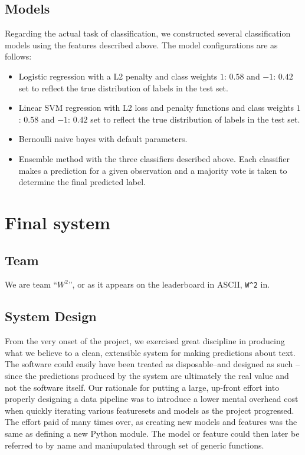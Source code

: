 \documentclass[
10pt, %
a4paper, %
oneside, %
headinclude,footinclude, %
BCOR5mm, %
]{scrartcl}
\begin{document}

\subsection{Models}
Regarding the actual task of classification, we constructed several 
classification models using the features described above. The model 
configurations are as follows:

\begin{itemize}
	\item Logistic regression with a L2 penalty and class weights $1$: $0.58$ and
	$-1$: $0.42$ set to reflect the true distribution of labels in the test set.

	\item Linear SVM regression with L2 loss and penalty functions and class 
	weights $1$: $0.58$ and $-1$: $0.42$ set to reflect the true distribution of
	labels in the test set.

	\item Bernoulli naive bayes with default parameters.

	\item Ensemble method with the three classifiers described above. Each 
	classifier makes a prediction for a given observation and a majority vote is
	taken to determine the final predicted label.
\end{itemize}

\break
\section{Final system}

\subsection{Team}

We are team ``$W^2$'', or as it appears on the leaderboard in ASCII,
\texttt{W\string^2} in.

\subsection{System Design}

From the very onset of the project, we exercised great discipline in producing
what we believe to a clean, extensible system for making predictions about text.
The software could easily have been treated as disposable--and designed as such
--since the predictions produced by the system are ultimately the real value and
not the software itself. Our rationale for putting a large, up-front effort into
properly designing a data pipeline was to introduce a lower mental overhead cost
when quickly iterating various featuresets and models as the project progressed.
The effort paid of many times over, as creating new models and features was the
same as defining a new Python module. The model or feature could then later be
referred to by name and maniupulated through set of generic functions.
\end{document}

